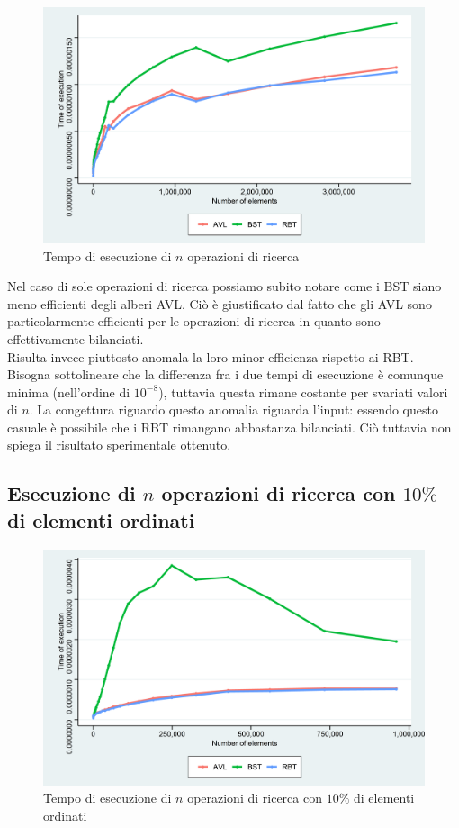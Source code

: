 \documentclass{article}
\begin{document}
	\begin{figure}[h!]
		\centering
  		\includegraphics[width=1 \columnwidth]{Grafici/Grafico_All_finds.png}
  		\caption{Tempo di esecuzione di $n$ operazioni di ricerca}
  		\label{fig:graph3}
	\end{figure}
	
	Nel caso di sole operazioni di ricerca possiamo subito notare come i BST siano meno efficienti degli alberi AVL. Ciò è giustificato dal fatto che gli AVL sono particolarmente efficienti per le operazioni di ricerca in quanto sono effettivamente bilanciati. \\
	Risulta invece piuttosto anomala la loro minor efficienza rispetto ai RBT. Bisogna sottolineare che la differenza fra i due tempi di esecuzione è comunque minima (nell'ordine di $10^{-8}$), tuttavia questa rimane costante per svariati valori di $n$. La congettura riguardo questo anomalia riguarda l'input: essendo questo casuale è possibile che i RBT rimangano abbastanza bilanciati. Ciò tuttavia non spiega il risultato sperimentale ottenuto.
	
	\newpage
	
	\subsection{Esecuzione di $n$ operazioni di ricerca con $10\%$ di elementi ordinati}
	
	\begin{figure}[h!]
		\centering
  		\includegraphics[width=1 \columnwidth]{Grafici/Grafico_All_find_ordered.png}
  		\caption{Tempo di esecuzione di $n$ operazioni di ricerca con $10\%$ di elementi ordinati}
  		\label{fig:graph4}
	\end{figure}
	
\end{document}
